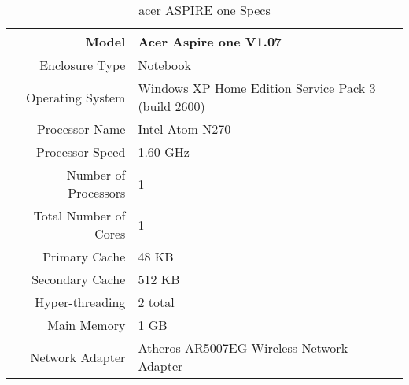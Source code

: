   \begin{table}
    \begin{center}
    \begin{tabular}{| r | p{5cm} |}
      \hline
      Model                        & Acer Aspire one V1.07 \\ \hline
      Enclosure Type               & Notebook \\ \hline
      Operating System             & Windows XP Home Edition Service Pack 3 (build
      2600) \\ \hline
      Processor Name               & Intel Atom N270 \\ \hline
      Processor Speed              & 1.60 GHz \\ \hline
      Number of Processors         & 1 \\ \hline
      Total Number of Cores        & 1 \\ \hline
      Primary Cache                & 48 KB \\ \hline
      Secondary Cache              & 512 KB \\ \hline
      Hyper-threading              & 2 total \\ \hline
      Main Memory                  & 1 GB \\ \hline
      Network Adapter              & Atheros AR5007EG Wireless Network Adapter \\
      \hline
    \end{tabular}
    \caption{acer ASPIRE one Specs}
    \label{aspireSpecs}
    \end{center}
  \end{table}

